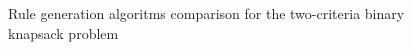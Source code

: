 \begin{figure}
  \centering
  \caption{Rule generation algoritms comparison for the two-criteria binary knapsack problem}
  \label{c2_bin_algo}
\end{figure}

